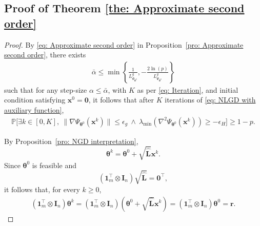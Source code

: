 \documentclass{siamart251216}
\begin{document}
\subsection{Proof of Theorem \ref{the: Approximate second order}}
\begin{proof}
    By \eqref{eq: Approximate second order} in
    Proposition~\ref{pro: Approximate second order}, there exists
    \begin{gather*}
        \bar{\alpha}
        \le
        \min\left\{
        \frac{1}{L_{\Psi_{\boldsymbol{\theta}^{0}}}^{g}},
        -\frac{2\ln(p)}{L_{\Psi_{\boldsymbol{\theta}^{0}}}^{g}}
        \right\}
    \end{gather*}
    such that for any step-size $\alpha \le \bar{\alpha}$,
    with $K$ as per \eqref{eq: Iteration}, and initial condition
    satisfying $\mathbf{x}^{0}=\bm{0}$, it follows that after
    $K$ iterations of \eqref{eq: NLGD with auxiliary function},
    \begin{align*}
        \mathbb{P}\Bigg[
        \exists k\in[0,K],~
        \|\nabla\Psi_{\boldsymbol{\theta}^{0}}(\mathbf{x}^{k})\|
        \le\epsilon_{g}
        ~\land~
        \lambda_{\min}
        \left(
        \nabla^{2}\Psi_{\boldsymbol{\theta}^{0}}(\mathbf{x}^{k})
        \right)
        \ge-\epsilon_{H}
        \Bigg]
        \ge 1-p.
    \end{align*}

    By Proposition~\ref{pro: NGD interpretation},
    \[
        \boldsymbol{\theta}^{k}
        =
        \boldsymbol{\theta}^{0}
        +
        \sqrt{\hat{\mathbf{L}}}\mathbf{x}^{k}.
    \]
    Since $\boldsymbol{\theta}^{0}$ is feasible and
    \[
        (\bm{1}_{m}^{\top}\otimes\mathbf{I}_{n})
        \sqrt{\hat{\mathbf{L}}}
        =
        \bm{0}^{\top},
    \]
    it follows that, for every $k\ge0$,
    \begin{gather*}
        (\bm{1}_{m}^{\top}\otimes\mathbf{I}_{n})
        \boldsymbol{\theta}^{k} =
        (\bm{1}_{m}^{\top}\otimes\mathbf{I}_{n})
        \left(
        \boldsymbol{\theta}^{0}
        +
        \sqrt{\hat{\mathbf{L}}}\mathbf{x}^{k}
        \right) =
        (\bm{1}_{m}^{\top}\otimes\mathbf{I}_{n})
        \boldsymbol{\theta}^{0} =
        \bm{r}.
    \end{gather*}


\end{proof}
\end{document}
